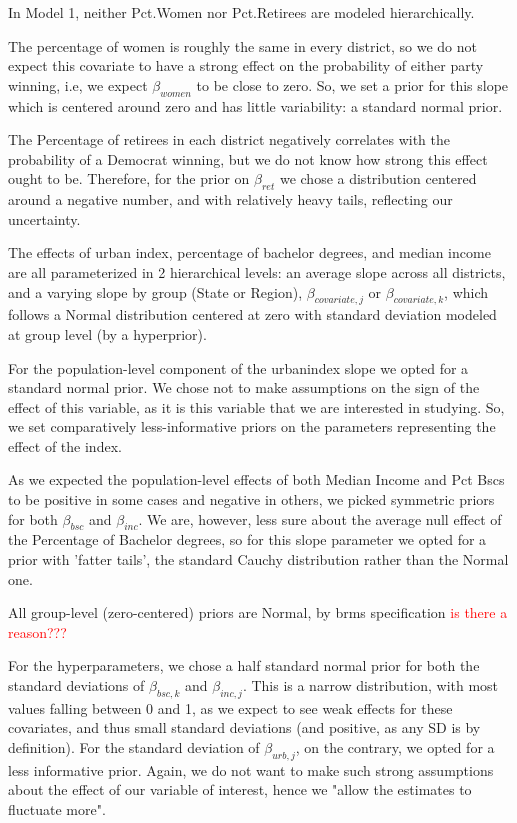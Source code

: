\documentclass[12pt]{article}
\begin{document}
In Model 1, neither Pct.Women nor Pct.Retirees are modeled hierarchically. 


The percentage of women is roughly the same in every district, so we do not expect this covariate to have a strong effect on the probability of either party winning, i.e, we expect $\beta_{women}$ to be close to zero. So, we set a prior for this slope which is centered around zero and has little variability: a standard normal prior. 

The Percentage of retirees in each district negatively correlates with the probability of a Democrat winning, but we do not know how strong this effect ought to be. Therefore, for the prior on $\beta_{ret}$ we chose a distribution centered around a negative number, and with relatively heavy tails, reflecting our uncertainty. 



The effects of urban index, percentage of bachelor degrees, and median income are all parameterized in 2 hierarchical levels: an average slope across all districts, and a varying slope by group (State or Region), $\beta_{covariate,j}$ or $\beta_{covariate,k}$, which follows a Normal distribution centered at zero with standard deviation modeled at group level (by a hyperprior).

 
For the population-level component of the urbanindex slope we opted for a standard normal prior. We chose not to make assumptions on the sign of the effect of this variable, as it is this variable that we are interested in studying. So, we set comparatively less-informative priors on the parameters representing the effect of the index.


As we expected the population-level effects of both Median Income and Pct Bscs to be positive in some cases and negative in others, we picked symmetric priors for both $\beta_{bsc}$ and $\beta_{inc}$. We are, however, less sure about the average null effect of the Percentage of Bachelor degrees, so for this slope parameter we opted for a prior with 'fatter tails', the standard Cauchy distribution rather than the Normal one.


All group-level (zero-centered) priors are Normal, by brms specification \textcolor{red}{is there a reason???}

For the hyperparameters, we chose a half standard normal prior for both the standard deviations of $\beta_{bsc,k}$ and $\beta_{inc,j}$. This is a narrow distribution, with most values falling between 0 and 1, as we expect to see weak effects for these covariates, and thus small standard deviations (and positive, as any SD is by definition). For the standard deviation of $\beta_{urb,j}$, on the contrary, we opted for a less informative prior. Again, we do not want to make such strong assumptions about the effect of our variable of interest, hence we "allow the estimates to fluctuate more".
\end{document}
